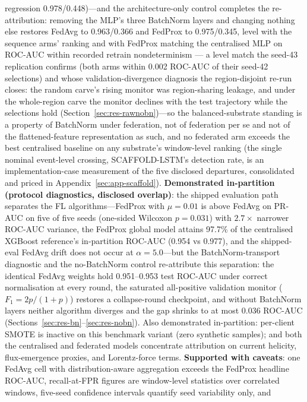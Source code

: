 regression 0.978/0.448)---and the architecture-only
control completes the re-attribution: removing the MLP's three
BatchNorm layers and changing nothing else restores FedAvg to
0.963/0.366 and FedProx to 0.975/0.345, level with the sequence
arms' ranking and with FedProx matching the centralised MLP on
ROC-AUC within recorded retrain nondeterminism --- a level match
the seed-43 replication confirms (both arms within 0.002 ROC-AUC
of their seed-42 selections) and whose validation-divergence
diagnosis the region-disjoint re-run closes: the random carve's
rising monitor was region-sharing leakage, and under the
whole-region carve the monitor declines with the test trajectory
while the selections hold (Section~\ref{sec:res-rawnobn})---so the balanced-substrate
standing is a property of BatchNorm under federation, not of
federation per se and not of the flattened-feature representation as
such, and no federated arm exceeds the best
centralised baseline on any substrate's window-level ranking (the
single nominal event-level crossing, SCAFFOLD-LSTM's detection
rate, is an implementation-case measurement of the five disclosed
departures, consolidated and priced in
Appendix~\ref{sec:app-scaffold}).
\textbf{Demonstrated in-partition (protocol diagnostics, disclosed
overlap)}: the shipped evaluation path separates the FL
algorithms---FedProx with $\mu{=}0.01$ is above FedAvg on PR-AUC on
five of five seeds (one-sided Wilcoxon $p=0.031$) with $2.7\times$
narrower ROC-AUC variance, the FedProx global model attains 97.7\% of
the centralised XGBoost reference's in-partition ROC-AUC (0.954 vs
0.977), and the shipped-eval FedAvg drift does not occur at
$\alpha{=}5.0$---but the BatchNorm-transport diagnostic and the
no-BatchNorm control re-attribute this separation: the identical
FedAvg weights hold 0.951--0.953 test ROC-AUC under correct
normalisation at every round, the saturated all-positive validation
monitor ($F_1 = 2p/(1{+}p)$) restores a collapse-round checkpoint, and
without BatchNorm layers neither algorithm diverges and the gap
shrinks to at most 0.036 ROC-AUC (Sections~\ref{sec:res-bn}--\ref{sec:res-nobn}).
Also demonstrated in-partition: per-client SMOTE is inactive on this
benchmark variant (zero synthetic samples); and both the centralised
and federated models concentrate attribution on current helicity,
flux-emergence proxies, and Lorentz-force terms.
\textbf{Supported with caveats}: one FedAvg cell with
distribution-aware
aggregation exceeds the FedProx headline ROC-AUC, recall-at-FPR
figures are window-level statistics over correlated windows,
five-seed confidence intervals quantify seed variability only, and
